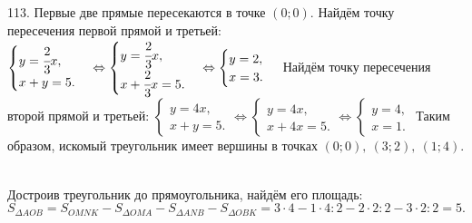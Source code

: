 113. Первые две прямые пересекаются в точке $(0;0).$ Найдём точку пересечения первой прямой и третьей: $\begin{cases}y=\cfrac{2}{3}x,\\ x+y=5.\end{cases}
\Leftrightarrow \begin{cases}y=\cfrac{2}{3}x,\\ x+\cfrac{2}{3}x=5.\end{cases}
\Leftrightarrow \begin{cases}y=2,\\ x=3.\end{cases}$ Найдём точку пересечения второй прямой и третьей: $\begin{cases}y=4x,\\ x+y=5.\end{cases}
\Leftrightarrow \begin{cases}y=4x,\\ x+4x=5.\end{cases}
\Leftrightarrow \begin{cases}y=4,\\ x=1.\end{cases}$ Таким образом, искомый треугольник имеет вершины в точках $(0;0),\ (3;2),\ (1;4).$\\
\begin{figure}[ht!]
\end{figure}\\
Достроив треугольник до прямоугольника, найдём его площадь: $S_{\Delta AOB}=S_{OMNK}-S_{\Delta OMA}-S_{\Delta ANB}-S_{\Delta OBK}=
3\cdot4-1\cdot4:2-2\cdot2:2-3\cdot2:2=5.$\\
